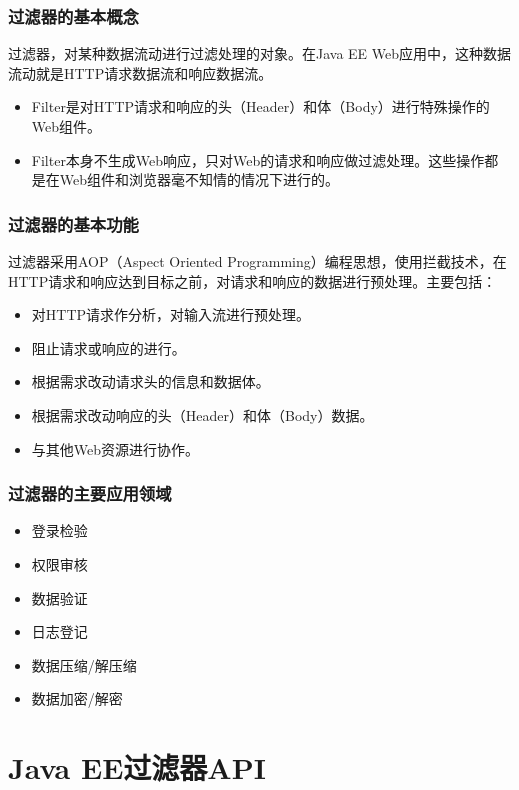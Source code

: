 \begin{frame}[fragile] %
\frametitle{过滤器的基本概念}

{\hei 过滤器，对某种数据流动进行过滤处理的对象。在Java EE Web应用中，这种数据流动就是HTTP请求数据流和响应数据流。}

\begin{itemize}
\item Filter是对HTTP请求和响应的头（Header）和体（Body）进行特殊操作的Web组件。
\item Filter本身不生成Web响应，只对Web的请求和响应做过滤处理。这些操作都是在Web组件和浏览器毫不知情的情况下进行的。
\end{itemize}
\end{frame}

\begin{frame}[fragile] %
\frametitle{过滤器的基本功能} 
过滤器采用AOP（Aspect Oriented Programming）编程思想，使用拦截技术，在HTTP请求和响应达到目标之前，对请求和响应的数据进行预处理。主要包括：
\begin{itemize}
\item 对HTTP请求作分析，对输入流进行预处理。
\item 阻止请求或响应的进行。
\item 根据需求改动请求头的信息和数据体。
\item 根据需求改动响应的头（Header）和体（Body）数据。
\item 与其他Web资源进行协作。
\end{itemize}
\end{frame}

\begin{frame}[fragile] %
\frametitle{过滤器的主要应用领域} 
\begin{itemize}
\item 登录检验
\item 权限审核
\item 数据验证
\item 日志登记
\item 数据压缩/解压缩
\item 数据加密/解密
\end{itemize}
\end{frame}

\section{Java EE过滤器API}

